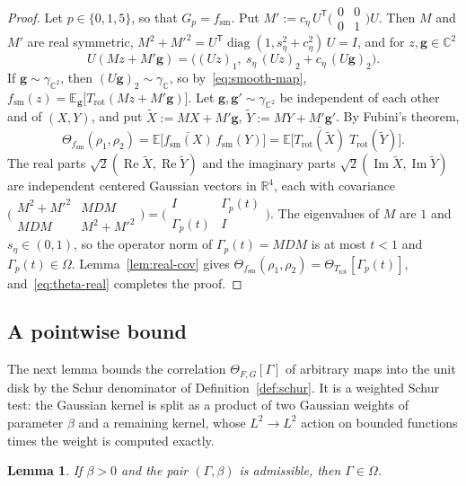 \documentclass[11pt,reqno]{amsart}
\newtheorem{lemma}[theorem]{Lemma}
\theoremstyle{definition}
\numberwithin{equation}{section}
\newcommand{\C}{\mathbb{C}}
\newcommand{\R}{\mathbb{R}}
\newcommand{\E}{\mathbb{E}}
\newcommand{\gC}{\gamma_{\C}}
\newcommand{\gCC}{\gamma_{\C^2}}
\newcommand{\Om}{\Omega}
\newcommand{\Trot}{T_{\mathrm{rot}}}
\newcommand{\fsm}{f_{\mathrm{sm}}}
\DeclareMathOperator{\RePart}{Re}
\DeclareMathOperator{\ImPart}{Im}
\DeclareMathOperator{\diag}{diag}
\begin{document}
\begin{proof}
Let $p\in\{0,1,5\}$, so that $G_p=\fsm$. Put $M':=c_\eta\,U^{\mathsf{T}}\bigl(\begin{smallmatrix}0&0\\0&1\end{smallmatrix}\bigr)U$. Then $M$ and $M'$ are real symmetric, $M^2+M'^2=U^{\mathsf{T}}\diag(1,s_\eta^2+c_\eta^2)\,U=I$, and for $z,\mathbf{g}\in\C^2$
\[
  U(Mz+M'\mathbf{g})=\bigl((Uz)_1,\ s_\eta\,(Uz)_2+c_\eta\,(U\mathbf{g})_2\bigr).
\]
If $\mathbf{g}\sim\gCC$, then $(U\mathbf{g})_2\sim\gC$, so by~\eqref{eq:smooth-map}, $\fsm(z)=\E_{\mathbf{g}}\bigl[\Trot(Mz+M'\mathbf{g})\bigr]$. Let $\mathbf{g},\mathbf{g}'\sim\gCC$ be independent of each other and of $(X,Y)$, and put $\widetilde X:=MX+M'\mathbf{g}$, $\widetilde Y:=MY+M'\mathbf{g}'$. By Fubini's theorem,
\[
  \Theta_{\fsm}(\rho_1,\rho_2)=\E\bigl[\overline{\fsm(X)}\,\fsm(Y)\bigr]=\E\bigl[\overline{\Trot(\widetilde X)}\;\Trot(\widetilde Y)\bigr].
\]
The real parts $\sqrt2(\RePart\widetilde X,\RePart\widetilde Y)$ and the imaginary parts $\sqrt2(\ImPart\widetilde X,\ImPart\widetilde Y)$ are independent centered Gaussian vectors in $\R^4$, each with covariance $\bigl(\begin{smallmatrix}M^2+M'^2&MDM\\ MDM&M^2+M'^2\end{smallmatrix}\bigr)=\bigl(\begin{smallmatrix}I&\Gamma_p(t)\\ \Gamma_p(t)&I\end{smallmatrix}\bigr)$. The eigenvalues of $M$ are $1$ and $s_\eta\in(0,1)$, so the operator norm of $\Gamma_p(t)=MDM$ is at most $t<1$ and $\Gamma_p(t)\in\Om$. Lemma~\ref{lem:real-cov} gives $\Theta_{\fsm}(\rho_1,\rho_2)=\Theta_{\Trot}[\Gamma_p(t)]$, and~\eqref{eq:theta-real} completes the proof.
\end{proof}

\subsection{A pointwise bound}
The next lemma bounds the correlation $\Theta_{F,G}[\Gamma]$ of arbitrary maps into the unit disk by the Schur denominator of Definition~\ref{def:schur}. It is a weighted Schur test: the Gaussian kernel is split as a product of two Gaussian weights of parameter $\beta$ and a remaining kernel, whose $L^2\to L^2$ action on bounded functions times the weight is computed exactly.

\begin{lemma}\label{lem:adm-omega}
If $\beta>0$ and the pair $(\Gamma,\beta)$ is admissible, then $\Gamma\in\Om$.
\end{lemma}
\end{document}
